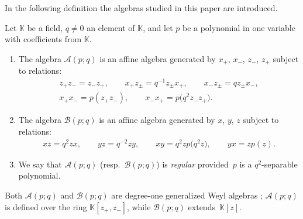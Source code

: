 \documentclass[10pt,a4paper]{amsart}
\numberwithin{equation}{section}
\def\Weyl#1#2{{\mathcal{B}}(#1;#2)}
\def\AWeyl#1#2{{\mathcal{A}}(#1;#2)}
\begin{document}
In the following def\/inition the algebras studied in this paper are introduced.

\begin{Definition}\label{def.Weyl}
Let ${\mathbb K}$ be a f\/ield, $q\neq 0$ an element of ${\mathbb K}$, and let $p$ be a polynomial in one variable with coef\/f\/icients from ${\mathbb K}$.

\begin{enumerate}\itemsep=0pt
\item[(1)] The algebra $\AWeyl p q$ is an af\/f\/ine algebra generated by $x_+$, $x_-$, $z_-$, $z_+$ subject to relations:
\begin{subequations}\label{a.weyl}
\begin{gather}
z_+ z_- = z_-z_+, \qquad x_+z_{\pm} = q^{-1}z_\pm x_+ , \qquad x_-z_{\pm} = qz_\pm x_-, \label{a.weyl1}\\
x_+x_- = p(z_+z_-), \qquad x_-x_+ = p\big(q^2z_-z_+\big). \label{a.weyl2}
\end{gather}
\end{subequations}

\item[(2)] The algebra $\Weyl p q$ is an af\/f\/ine algebra generated by $x$, $y$, $z$ subject to relations:
\begin{gather*}%
 xz = q^2 z x , \qquad yz = q^{-2}zy, \qquad xy = q^2 zp\big(q^2z\big), \qquad yx = zp(z).
\end{gather*}
\item[(3)] We say that $\AWeyl p q$ (resp.\ $\Weyl p q$) is {\em regular} provided~$p$ is a $q^2$-separable polynomial.
\end{enumerate}
\end{Definition}

Both $\AWeyl p q$ and $\Weyl p q$ are degree-one generalized Weyl algebras \cite{Bav:gweyl}; $\AWeyl p q$ is def\/ined over the ring ${\mathbb K}[z_+, z_-]$, while $\Weyl p q$ extends~${\mathbb K}[z]$.
\end{document}
